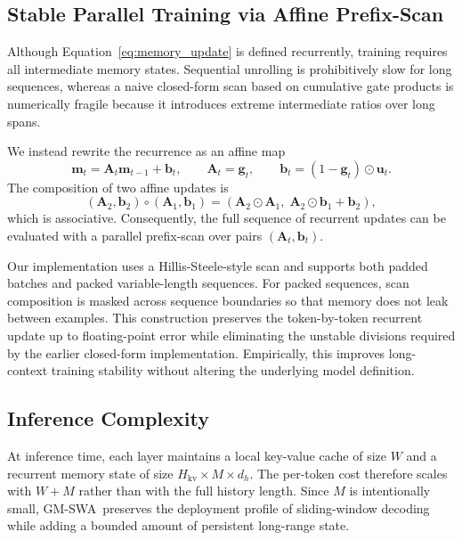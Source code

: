 \documentclass{article}
\newcommand{\model}{GM-SWA}
\begin{document}
\subsection{Stable Parallel Training via Affine Prefix-Scan}

Although Equation~\ref{eq:memory_update} is defined recurrently, training requires all intermediate memory states. Sequential unrolling is prohibitively slow for long sequences, whereas a naive closed-form scan based on cumulative gate products is numerically fragile because it introduces extreme intermediate ratios over long spans.

We instead rewrite the recurrence as an affine map
\begin{equation}
\mathbf{m}_t = \mathbf{A}_t \mathbf{m}_{t-1} + \mathbf{b}_t,
\qquad
\mathbf{A}_t = \mathbf{g}_t,
\qquad
\mathbf{b}_t = \left(1-\mathbf{g}_t\right)\odot \mathbf{u}_t.
\label{eq:affine_form}
\end{equation}
The composition of two affine updates is
\begin{equation}
(\mathbf{A}_2, \mathbf{b}_2) \circ (\mathbf{A}_1, \mathbf{b}_1)
=
(\mathbf{A}_2 \odot \mathbf{A}_1,\;
\mathbf{A}_2 \odot \mathbf{b}_1 + \mathbf{b}_2),
\label{eq:affine_compose}
\end{equation}
which is associative. Consequently, the full sequence of recurrent updates can be evaluated with a parallel prefix-scan over pairs $(\mathbf{A}_t,\mathbf{b}_t)$.

Our implementation uses a Hillis-Steele-style scan and supports both padded batches and packed variable-length sequences. For packed sequences, scan composition is masked across sequence boundaries so that memory does not leak between examples. This construction preserves the token-by-token recurrent update up to floating-point error while eliminating the unstable divisions required by the earlier closed-form implementation. Empirically, this improves long-context training stability without altering the underlying model definition.

\subsection{Inference Complexity}

At inference time, each layer maintains a local key-value cache of size $W$ and a recurrent memory state of size $H_{\mathrm{kv}} \times M \times d_h$. The per-token cost therefore scales with $W+M$ rather than with the full history length. Since $M$ is intentionally small, \model\ preserves the deployment profile of sliding-window decoding while adding a bounded amount of persistent long-range state.
\end{document}

